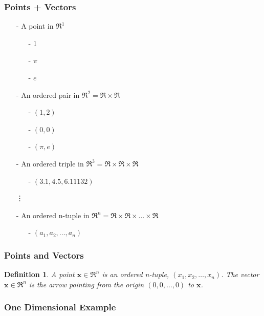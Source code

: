 \documentclass{beamer}
\newtheorem{defn}{Definition}
\numberwithin{equation}{section}
\begin{document}
\begin{frame}
\frametitle{Points + Vectors} 
\begin{itemize}
\item[-] A point in $\Re^{1}$ 
\begin{itemize}
\item[-] 1 
\item[-] $\pi$
\item[-] $e$
\end{itemize}
\item[-] An ordered pair in $\Re^{2} = \Re \times \Re$ 
\begin{itemize}
\item[-] $(1,2)$
\item[-] $(0,0)$
\item[-] $(\pi, e)$
\end{itemize}
\item[-] An ordered triple in $\Re^{3} = \Re \times \Re \times \Re$
\begin{itemize}
\item[-] $(3.1, 4.5, 6.11132)$
\end{itemize}
\item[] \vdots 
\item[-] An ordered n-tuple in $\Re^{n} = \Re \times \Re \times \hdots \times \Re$
\begin{itemize}
\item[-] $(a_{1}, a_{2}, \hdots, a_{n} ) $
\end{itemize}
\end{itemize}

\end{frame}


\begin{frame}
\frametitle{Points and Vectors} 

\begin{defn} 
A point $\boldsymbol{x} \in \Re^{n}$ is an ordered n-tuple, $(x_{1}, x_{2}, \hdots, x_{n})$.  The vector $\boldsymbol{x} \in \Re^{n}$ is the arrow pointing from the origin $(0, 0, \hdots, 0)$ to $\boldsymbol{x}$.  
\end{defn}
\end{frame}


\begin{frame}
\frametitle{One Dimensional Example}



\end{frame}
\end{document}
